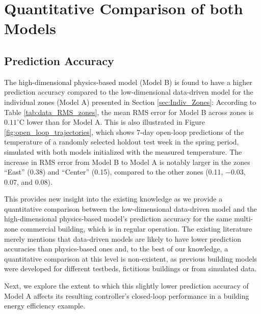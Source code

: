 
\section{Quantitative Comparison of both Models}
\label{sec:Comparison}

\subsection{Prediction Accuracy}\label{sec:prediction_accuracy}
The high-dimensional physics-based model (Model B) is found to have a higher prediction accuracy compared to the low-dimensional data-driven model for the individual zones (Model A) presented in Section \ref{sec:Indiv_Zones}: According to Table \ref{tab:data_RMS_zones}, the mean RMS error for Model B across zones is $0.11^\circ \text{C}$ lower than for Model A. This is also illustrated in Figure \ref{fig:open_loop_trajectories}, which shows 7-day open-loop predictions of the temperature of a randomly selected holdout test week in the spring period, simulated with both models initialized with the measured temperature. The increase in RMS error from Model B to Model A is notably larger in the zones ``East'' (0.38) and ``Center'' (0.15), compared to the other zones (0.11, $-$0.03, 0.07, and 0.08). 

This provides new insight into the existing knowledge as we provide a quantitative comparison between the low-dimensional data-driven model and the high-dimensional physics-based model's prediction accuracy for the same multi-zone commercial building, which is in regular operation. The existing literature merely mentions that data-driven models are likely to have lower prediction accuracies than physics-based ones and, to the best of our knowledge, a quantitative comparison at this level is non-existent, as previous building models were developed for different testbeds, fictitious buildings or from simulated data.

Next, we explore the extent to which this slightly lower prediction accuracy of Model A affects its resulting controller's closed-loop performance in a building energy efficiency example.


